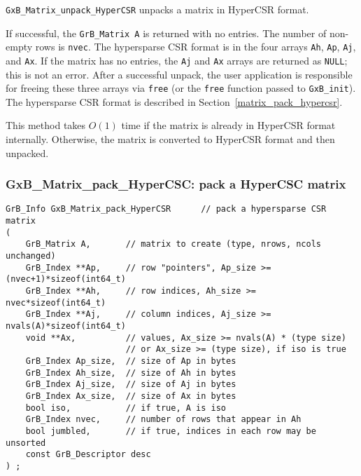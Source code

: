 \documentclass[12pt]{article}
\begin{document}
\verb'GxB_Matrix_unpack_HyperCSR' unpacks a matrix in HyperCSR format.

If successful, the \verb'GrB_Matrix A' is returned with no entries.
The number of non-empty rows is
\verb'nvec'.  The hypersparse CSR format is in the four arrays \verb'Ah',
\verb'Ap', \verb'Aj', and \verb'Ax'.  If the matrix has no entries, the
\verb'Aj' and \verb'Ax' arrays are returned as \verb'NULL'; this is not an
error.  After a successful unpack, the user application is responsible for
freeing these three arrays via \verb'free' (or the \verb'free' function passed
to \verb'GxB_init').  The hypersparse CSR format is described in
Section~\ref{matrix_pack_hypercsr}.

This method takes $O(1)$ time if the matrix is already in HyperCSR format
internally.  Otherwise, the matrix is converted to HyperCSR format and then
unpacked.

\newpage
\subsubsection{{\sf GxB\_Matrix\_pack\_HyperCSC:} pack a HyperCSC matrix}
\label{matrix_pack_hypercsc}

\begin{mdframed}[userdefinedwidth=6in]
{\footnotesize
\begin{verbatim}
GrB_Info GxB_Matrix_pack_HyperCSR      // pack a hypersparse CSR matrix
(
    GrB_Matrix A,       // matrix to create (type, nrows, ncols unchanged)
    GrB_Index **Ap,     // row "pointers", Ap_size >= (nvec+1)*sizeof(int64_t)
    GrB_Index **Ah,     // row indices, Ah_size >= nvec*sizeof(int64_t)
    GrB_Index **Aj,     // column indices, Aj_size >= nvals(A)*sizeof(int64_t)
    void **Ax,          // values, Ax_size >= nvals(A) * (type size)
                        // or Ax_size >= (type size), if iso is true
    GrB_Index Ap_size,  // size of Ap in bytes
    GrB_Index Ah_size,  // size of Ah in bytes
    GrB_Index Aj_size,  // size of Aj in bytes
    GrB_Index Ax_size,  // size of Ax in bytes
    bool iso,           // if true, A is iso
    GrB_Index nvec,     // number of rows that appear in Ah
    bool jumbled,       // if true, indices in each row may be unsorted
    const GrB_Descriptor desc
) ;
\end{verbatim}
} \end{mdframed}
\end{document}
